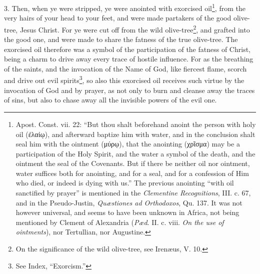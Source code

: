 3. Then, when ye were stripped, ye were anointed with exorcised oil\footnote{Apost. Const. vii. 22: “But thou shalt beforehand anoint the person with holy oil (\textgreek{ἐλαίῳ}), and afterward baptize him with water, and in the conclusion shalt seal him with the ointment (\textgreek{μύρῳ}), that the anointing (\textgreek{χρῖσμα}) may be a participation of the Holy Spirit, and the water a symbol of the death, and the ointment the seal of the Covenants. But if there be neither oil nor ointment, water suffices both for anointing, and for a seal, and for a confession of Him who died, or indeed is dying with us.” The previous anointing “with oil sanctified by prayer” is mentioned in the \emph{Clementine Recognitions}, III. c. 67, and in the Pseudo-Justin, \emph{Quæstiones ad Orthodoxos}, Qu. 137. It was not however universal, and seems to have been unknown in Africa, not being mentioned by Clement of Alexandria (\emph{Pæd}. II. c. viii. \emph{On the use of ointments}), nor Tertullian, nor Augustine.}, from the very hairs of your head to your feet, and were made partakers of the good olive-tree, Jesus Christ. For ye were cut off from the wild olive-tree\footnote{On the significance of the wild olive-tree, see Irenæus, V. 10.}, and grafted into the good one, and were made to share the fatness of the true olive-tree. The exorcised oil therefore was a symbol of the participation of the fatness of Christ, being a charm to drive away every trace of hostile influence. For as the breathing of the saints, and the invocation of the Name of God, like fiercest flame, scorch and drive out evil spirits\footnote{See Index, “Exorcism.”}, so also this exorcised oil receives such virtue by the invocation of God and by prayer, as not only to burn and cleanse away the traces of sins, but also to chase away all the invisible powers of the evil one.


